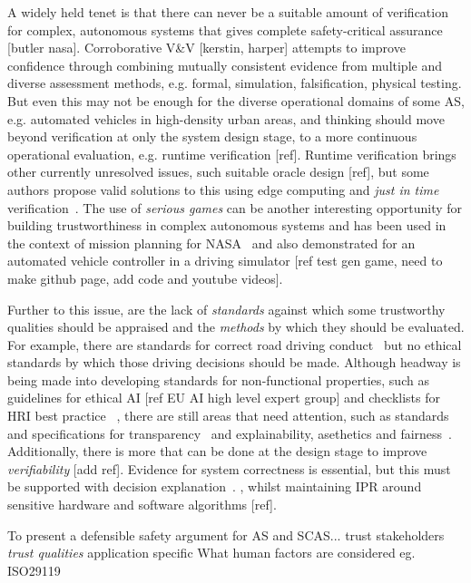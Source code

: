 A widely held tenet is that there can never be a suitable amount of verification for complex, autonomous systems that gives complete safety-critical assurance [butler nasa]. Corroborative V\&V [kerstin, harper] attempts to improve confidence through combining mutually consistent evidence from multiple and diverse assessment methods, e.g. formal, simulation, falsification, physical testing. 
%
But even this may not be enough for the diverse operational domains of some AS, e.g. automated vehicles in high-density urban areas, and thinking should move beyond verification at only the system design stage, to a more continuous operational evaluation, e.g. runtime verification [ref]. Runtime verification brings other currently unresolved issues, such suitable oracle design [ref], but some authors propose valid solutions to this using edge computing and \emph{just in time} verification~\cite{CyRes20,eder2021cyres}. 
%
The use of \emph{serious games} can be another interesting opportunity for building trustworthiness in complex autonomous systems and has been used in the context of mission planning for NASA~\cite{Allen2018} and also demonstrated for an automated vehicle controller in a driving simulator [ref test gen game, need to make github page, add code and youtube videos]. 



Further to this issue, are the lack of \emph{standards} against which some trustworthy qualities should be appraised and the \emph{methods} by which they should be evaluated. For example, there are standards for correct road driving conduct~\cite{highwayCode} but no ethical standards by which those driving decisions should be made. 
%
Although headway is being made into developing standards for non-functional properties, such as guidelines for ethical AI [ref EU AI high level expert group] and checklists for HRI best practice ~\cite{kraus2022trustworthy}, there are still areas that need attention, such as standards and specifications for transparency~\cite{winfield2021ieee} and explainability, asethetics and fairness~\cite{Abeywickrama2022}. 
%
Additionally, there is more that can be done at the design stage to improve \emph{verifiability} [add ref]. Evidence for system correctness is essential, but this must be supported with decision explanation~\cite{koopman2018toward}. , whilst maintaining IPR around sensitive hardware and software algorithms [ref]. 



%
To present a defensible safety argument for AS and SCAS...
trust stakeholders
\emph{trust qualities}
application specific
What human factors are considered eg. ISO29119


